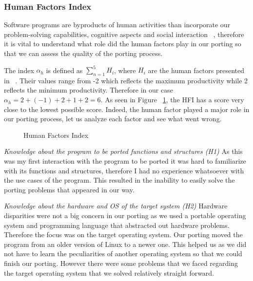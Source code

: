 \subsubsection{Human Factors Index}

Software programs are byproducts of human
activities than incorporate our problem-solving capabilities, cognitive aspects
and social interaction ~\cite{b3}, therefore it is vital to understand what role
did the human factors play in our porting so that we can assess the quality of
the porting process. 

The index $\alpha_h$ is defined as $\sum_{n=1}^{5} H_i$, where $H_i$ are the
human factors presented in ~\cite{b2}. Their values range from -2 which reflects
the maximum productivity while 2 reflects the minimum productivity. Therefore
in our case $\alpha_h = 2 + (-1) + 2 + 1 + 2 = 6$. As seen in Figure
~\ref{fig:HFI}, the HFI has a score very close to the lowest possible score.
Indeed, the human factor played a major role in our porting process, let us
analyze each factor and see what went wrong.

\begin{figure}

    \caption{Human Factors Index}
    \label{fig:HFI}
\end{figure}

\textit{Knowledge about the program to be ported functions and structures (H1)} 
As this was my first interaction with the program to be ported it was hard to
familiarize with its functions and structures, therefore I had no experience
whatsoever with the use cases of the program. This resulted in the inability to
easily solve the porting problems that appeared in our way.

\textit{Knowledge about the hardware and OS of the target system (H2)}
Hardware disparities were not a big concern in our porting as we used a portable
operating system and programming language that abstracted out hardware problems.
Therefore the focus was on the target operating system. Our porting moved the
program from an older version of Linux to a newer one. This helped us as we
did not have to learn the peculiarities of another operating system so that we
could finish our porting. However there were some problems that we faced
regarding the target operating system that we solved relatively straight
forward.

